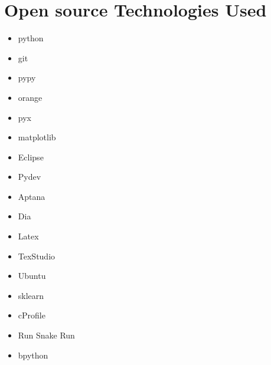 \documentclass[a4paper,11pt]{report}
\begin{document}
\section{Open source Technologies Used}
\begin{itemize}
\item python
\item git
\item pypy
\item orange
\item pyx
\item matplotlib
\item Eclipse
\item Pydev
\item Aptana
\item Dia
\item Latex
\item TexStudio
\item Ubuntu
\item sklearn
\item cProfile
\item Run Snake Run
\item bpython
\end{itemize}





\end{document}
